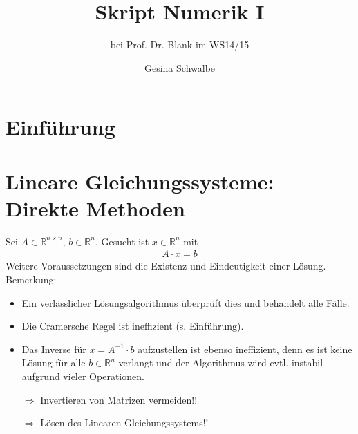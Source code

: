 \documentclass[ngerman,fontsize=11pt, paper=a4, parskip=false, titlepage=false, toc=bib]{scrbook}
\newcommand{\R}{\mathbb{R}}
\begin{document}

	\title{Skript Numerik I}
	\subtitle{bei Prof. Dr. Blank im WS14/15}
	\author{Gesina Schwalbe}
\maketitle

\tableofcontents



\chapter{Einführung}

\chapter{Lineare Gleichungssysteme: Direkte Methoden}
\label{2.1}
Sei $ A \in \R^{n\times n}$, $b \in \R^n$. Gesucht ist $x\in \R^n$ mit 
\begin{gather*}
	A\cdot x = b
\end{gather*}
Weitere Voraussetzungen sind die Existenz und Eindeutigkeit einer Lösung.
Bemerkung:
\begin{itemize}
	\item Ein verlässlicher Lösungsalgorithmus überprüft dies und behandelt alle Fälle. 
	\item Die Cramersche Regel ist ineffizient (s. Einführung).
	\item Das Inverse für $x=A^{-1}\cdot b$ aufzustellen ist ebenso ineffizient, denn es ist keine Lösung für alle $b\in \R^n$ verlangt und der Algorithmus wird evtl. instabil aufgrund vieler Operationen.
	\item [$\Rightarrow$] Invertieren von Matrizen vermeiden!!
	\item [$\Rightarrow$] Lösen des Linearen Gleichungssystems!!
\end{itemize}
\end{document}
